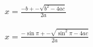\documentclass{article}
\begin{document}
$x = \frac{-b+-\sqrt{b^2-4ac}}{2a}$\\\\
$x = \frac{-\sin\pi+-\sqrt{\sin^2\pi-4ac}}{2a}$
\end{document}
